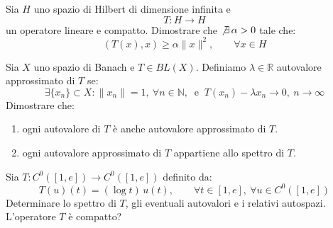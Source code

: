 \documentclass[12pt]{article}
\begin{document}
    \begin{ejercicio}[4 punti]
		Sia $H$ uno spazio di Hilbert di dimensione infinita e 
		$$T : H \to H$$
		un operatore lineare e compatto. Dimostrare che $\not\exists \, \alpha > 0$ tale che:
		\[
		(T(x), x) \ge \alpha \|x\|^2, \qquad \forall x \in H
		\]
	\end{ejercicio}

	\begin{ejercicio}[8 punti]
		Sia $X$ uno spazio di Banach e $T \in BL(X)$. Definiamo $\lambda \in \mathbb{R}$ autovalore approssimato di $T$ se: \\
		$$\exists \{x_n\} \subset X : \|x_n\| = 1, \ \forall n \in \mathbb{N}, \ \text{ e } \ T(x_n) - \lambda x_n \to 0, \ n \to \infty$$
		Dimostrare che:
		\begin{enumerate}
			\item[(i)] ogni autovalore di $T$ è anche autovalore approssimato di $T$.
			\item[(ii)] ogni autovalore approssimato di $T$ appartiene allo spettro di $T$.
		\end{enumerate}		
	\end{ejercicio}

	\begin{ejercicio}[8 punti]
		Sia $T : C^0([1, e]) \to C^0([1, e])$ definito da:
		\[
		T(u)(t) = (\log t) \, u(t), \qquad \forall t \in [1, e], \ \forall u \in C^0([1, e])
		\]
		Determinare lo spettro di $T$, gli eventuali autovalori e i relativi autospazi. L'operatore $T$ è compatto?
	\end{ejercicio}
\end{document}
